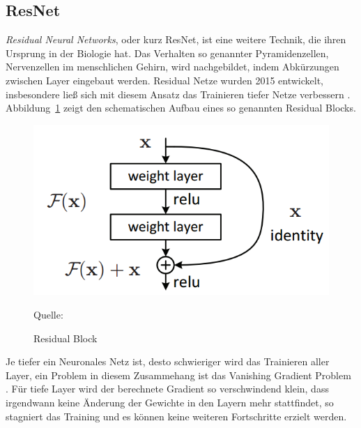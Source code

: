 \subsection{ResNet}
\textit{Residual Neural Networks}, oder kurz ResNet, ist eine weitere Technik, die ihren Ursprung in der Biologie hat. Das Verhalten so genannter Pyramidenzellen, Nervenzellen im menschlichen Gehirn, wird nachgebildet, indem Abkürzungen zwischen Layer eingebaut werden. Residual Netze wurden 2015 entwickelt, insbesondere ließ sich mit diesem Ansatz das Trainieren tiefer Netze verbessern \cite{DBLP:journals/corr/HeZRS15}. Abbildung~\ref{img:ResBlock} zeigt den schematischen Aufbau eines so genannten Residual Blocks. 

\begin{figure}[h]
	\centering
	\includegraphics[scale=0.5]{figures/ResidualBlock.png}
	\caption{Residual Block}
	Quelle: 
	\label{img:ResBlock}
\end{figure}

Je tiefer ein Neuronales Netz ist, desto schwieriger wird das Trainieren aller Layer, ein Problem in diesem Zusammehang ist das \glqq Vanishing Gradient Problem \grqq{}. Für tiefe Layer wird der berechnete Gradient so verschwindend klein, dass irgendwann keine Änderung der Gewichte in den Layern mehr stattfindet, so stagniert das Training und es können keine weiteren Fortschritte erzielt werden.

